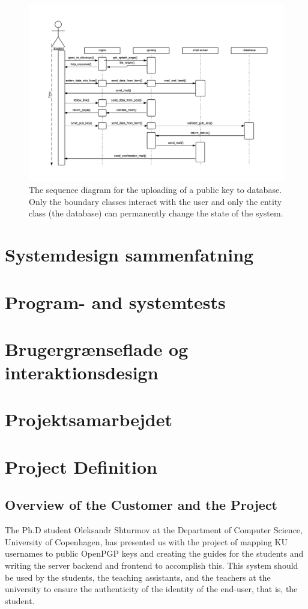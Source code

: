 \documentclass[11pt,a4paper]{report}
\begin{document}
\begin{figure}[H]
    \centering
    \includegraphics[width=1.2\textwidth]{pictures/sequence_diagram}
    \caption{The sequence diagram for the uploading of a public key to database. Only the boundary classes interact with the user and only the entity class (the database) can permanently change the state  of the system.}
    \label{fig:sequence_diagram}
\end{figure}

\section{Systemdesign sammenfatning}\label{sec:Systemdesign_sammenfatning}

\section{Program- and systemtests}\label{sec:Program_systemtests}

\section{Brugergrænseflade og interaktionsdesign}

\section{Projektsamarbejdet}

\section{Project Definition}
\subsection{Overview of the Customer and the Project}
The Ph.D student Oleksandr Shturmov at the Department of Computer Science, University of Copenhagen, has presented us with the project of mapping KU usernames to public OpenPGP keys and creating the guides for the students and writing the server backend and frontend to accomplish this. This system should be used by the students, the teaching assistants, and the teachers at the university to ensure the authenticity of the identity of the end-user, that is, the student.
\end{document}
